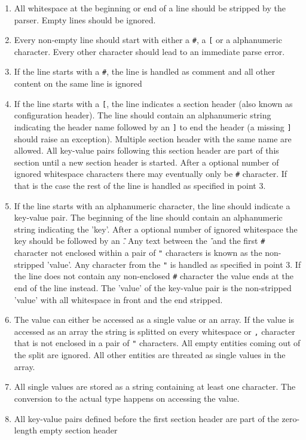 \begin{enumerate}
\item All whitespace at the beginning or end of a line should be stripped by the parser. Empty lines should be ignored.
\item Every non-empty line should start with either a \texttt{\#}, a \texttt{[} or a alphanumeric character. Every other character should lead to an immediate parse error.
\item If the line starts with a \texttt{\#}, the line is handled as comment and all other content on the same line is ignored
\item If the line starts with a \texttt{[}, the line indicates a section header (also known as configuration header). The line should contain an alphanumeric string indicating the header name followed by an \texttt{]} to end the header (a missing \texttt{]} should raise an exception). Multiple section header with the same name are allowed. All key-value pairs following this section header are part of this section until a new section header is started. After a optional number of ignored whitespace characters there may eventually only be \texttt{\#} character. If that is the case the rest of the line is handled as specified in point 3.
\item If the line starts with an alphanumeric character, the line should indicate a key-value pair. The beginning of the line should contain an alphanumeric string indicating the 'key'. After a optional number of ignored whitespace the key should be followed by an \texttt{\=}. Any text between the \texttt{\=} and the first \texttt{\#} character not enclosed within a pair of \texttt{"} characters is known as the non-stripped 'value'. Any character from the \texttt{"} is handled as specified in point 3. If the line does not contain any non-enclosed \texttt{\#} character the value ends at the end of the line instead. The 'value' of the key-value pair is the non-stripped 'value' with all whitespace in front and the end stripped.
\item The value can either be accessed as a single value or an array. If the value is accessed as an array the string is splitted on every whitespace or \texttt{,} character that is not enclosed in a pair of \texttt{"} characters. All empty entities coming out of the split are ignored. All other entities are threated as single values in the array.
\item All single values are stored as a string containing at least one character. The conversion to the actual type happens on accessing the value.
\item All key-value pairs defined before the first section header are part of the zero-length empty section header
\end{enumerate}

